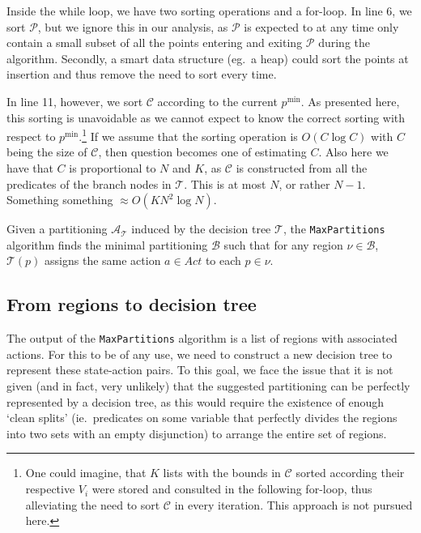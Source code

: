 Inside the while loop, we have two sorting operations and a for-loop. In line 6,
we sort $\mathcal{P}$, but we ignore this in our analysis, as $\mathcal{P}$ is
expected to at any time only contain a small subset of all the points entering
and exiting $\mathcal{P}$ during the algorithm. Secondly, a smart data structure
(eg.\ a heap) could sort the points at insertion and thus remove the need to
sort every time.

In line 11, however, we sort $\mathcal{C}$ according to the current $p^{\min}$.
As presented here, this sorting is unavoidable as we cannot expect to know the
correct sorting with respect to $p^{\min}$.\footnote{%
    One could imagine, that $K$ lists with the bounds in $\mathcal{C}$ sorted
    according their respective $V_i$ were stored and consulted in the following
    for-loop, thus alleviating the need to sort $\mathcal{C}$ in every
    iteration. This approach is not pursued here.
} If we assume that the sorting operation is $O(C\log C)$ with $C$ being the
size of $\mathcal{C}$, then question becomes one of estimating $C$. Also here we
have that $C$ is proportional to $N$ and $K$, as $\mathcal{C}$ is constructed
from all the predicates of the branch nodes in $\mathcal{T}$. This is at most
$N$, or rather $N-1$. Something something $\approx O(KN^2\log N)$.

\begin{theorem}
    Given a partitioning $\mathcal{A}_{\mathcal{T}}$ induced by the decision
    tree $\mathcal{T}$, the \texttt{MaxPartitions} algorithm finds the minimal
    partitioning $\mathcal{B}$ such that for any region $\nu \in \mathcal{B}$,
    $\mathcal{T}(p)$ assigns the same action $a \in Act$ to each $p \in \nu$.
\end{theorem}

\subsection{From regions to decision tree}%
\label{sub:regionsToDT}

The output of the \texttt{MaxPartitions} algorithm is a list of regions with
associated actions. For this to be of any use, we need to construct a new
decision tree to represent these state-action pairs. To this goal, we face the
issue that it is not given (and in fact, very unlikely) that the suggested
partitioning can be perfectly represented by a decision tree, as this would
require the existence of enough `clean splits' (ie.\ predicates on some variable
that perfectly divides the regions into two sets with an empty disjunction) to
arrange the entire set of regions.

